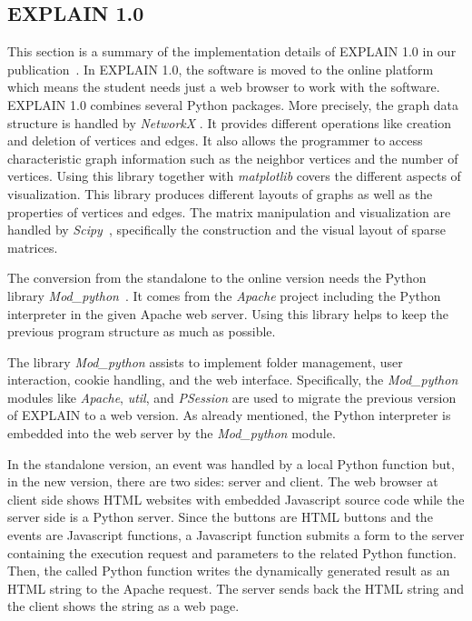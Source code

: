 \documentclass[12pt, twoside,a4paper,toc=bibliography]{scrbook}
\begin{document}
\subsection{EXPLAIN 1.0}
\label{s.impl.explain1}
This section is a summary of the implementation details 
of EXPLAIN 1.0 in our publication~\cite{2013:05}.
In EXPLAIN 1.0, the software is moved to the online platform which means the student needs just a web browser to work with the software.
EXPLAIN 1.0 combines several Python packages. More precisely, the graph data structure is handled by \textit{NetworkX} \cite{networkx2008}. It provides different operations like creation and deletion of vertices and edges. It also allows the programmer to access characteristic graph information such as the neighbor vertices and the number of vertices. Using this library together with \textit{matplotlib} \cite{matplotlib2007} covers the different aspects of visualization. This library produces different layouts of graphs as well as the properties of vertices and edges. The matrix manipulation and visualization are handled by \textit{Scipy}~\cite{scipy2001}, specifically the construction and the visual layout of sparse matrices.

The conversion from the standalone to the online version needs the Python library \textit{Mod\_python}~\cite{modpython2013}. It comes from the \textit{Apache} project including the Python interpreter in the given Apache web server. Using this library helps to keep the previous program structure as much as possible.

The library \textit{Mod\_python} assists to implement folder management, user interaction, cookie handling, and the web interface. Specifically, the \textit{Mod\_python} modules like \textit{Apache}, \textit{util}, and \textit{PSession} are used to migrate the previous version of \mbox{EXPLAIN} to a web version. As already mentioned, the Python interpreter is embedded into the web server by the \textit{Mod\_python} module.

In the standalone version, an event was handled by a local Python function but, in the new version, there are two sides: server and client. The web browser at client side shows HTML websites with embedded Javascript source code while the server side is a Python server. Since the buttons are HTML buttons and the events are Javascript functions, a Javascript function submits a form to the server containing the execution request and parameters to the related Python function. Then, the called Python function writes the dynamically generated result as an HTML string to the Apache request. The server sends back the HTML string and the client shows the string as a web
page.
\end{document}
